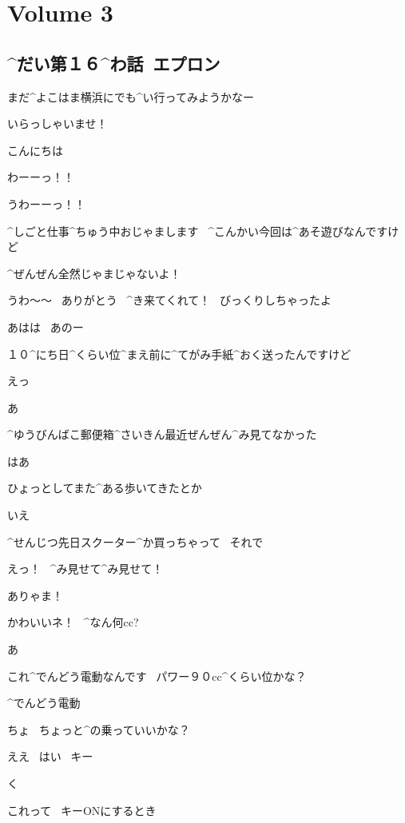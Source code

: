\section{Volume 3}

\subsection{^{だい}{第}１６^{わ}{話}\ エプロン}

\page[5]
\Alpha まだ^{よこはま}{横浜}にでも^{い}{行}ってみようかなー

\Alpha いらっしゃいませ！

\page
\Kokone こんにちは

\Alpha わーーっ！！

\Alpha うわーーっ！！

\page
\Kokone ^{しごと}{仕事}^{ちゅう}{中}おじゃまします
\ ^{こんかい}{今回}は^{あそ}{遊}びなんですけど

\Alpha ^{ぜんぜん}{全然}じゃまじゃないよ！

\Alpha うわ〜〜
\ ありがとう
\ ^{き}{来}てくれて！
\ びっくりしちゃったよ

\Kokone あはは
\ あのー

\Kokone １０^{にち}{日}^{くらい}{位}^{まえ}{前}に^{てがみ}{手紙}^{おく}{送}ったんですけど

\Alpha えっ

\Alpha あ

\Alpha ^{ゆうびんばこ}{郵便箱}^{さいきん}{最近}ぜんぜん^{み}{見}てなかった

\Kokone はあ

\page
\Alpha ひょっとしてまた^{ある}{歩}いてきたとか

\Kokone いえ

\Kokone ^{せんじつ}{先日}スクーター^{か}{買}っちゃって
\ それで

\Alpha えっ！
\ ^{み}{見}せて^{み}{見}せて！

\page
\Alpha ありゃま！

\Alpha かわいいネ！
\ ^{なん}{何}cc?

\Kokone あ

\Kokone これ^{でんどう}{電動}なんです
\ パワー９０cc^{くらい}{位}かな？

\Alpha ^{でんどう}{電動}

\Alpha ちょ
\ ちょっと^{の}{乗}っていいかな？

\Kokone ええ
\ はい
\ キー

\page
\Alpha く

\Alpha これって
\ キーONにするとき

